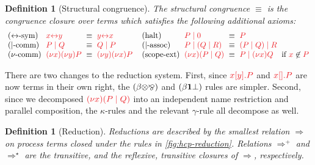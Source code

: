 \documentclass[submission,copyright,creativecommons]{eptcs}
\newtheorem{definition}[lemma]{Definition}
\begin{document}
\begin{definition}[Structural congruence]\label{def:hcp-equiv}
  The structural congruence $\equiv$ is the congruence closure over terms which satisfies the following additional axioms:
  \[
    \setlength{\arraycolsep}{3pt}
    \begin{array}{llcllllcll}
        \cpEquivLinkComm
      & \tm{\cpLink{x}{y}}
      & \equiv
      & \tm{\cpLink{y}{x}}
      &
      &
        \hccpEquivMixHalt1
      & \tm{\piPar{P}{\piHalt}}
      & \equiv
      & \tm{P}
      &
      \\
        \hccpEquivMixComm
      & \tm{\piPar{P}{Q}}
      & \equiv
      & \tm{\piPar{Q}{P}}
      &
      &
        \hccpEquivMixAss1
      & \tm{\piPar{P}{( \piPar{Q}{R} )}}
      & \equiv
      & \tm{\piPar{( \piPar{P}{Q} )}{R}}
      &
      \\
        \hccpEquivNewComm
      & \tm{\piNew{x}{\piNew{y}{P}}}
      & \equiv
      & \tm{\piNew{y}{\piNew{x}{P}}}
      &
      &
        \hccpEquivScopeExt1
      & \tm{\piNew{x}{( \piPar{P}{Q} )}}
      & \equiv
      & \tm{\piPar{P}{\piNew{x}{Q}}}
      & \text{if }\notFreeIn{x}{P}
    \end{array}
  \]
\end{definition}\noindent
There are two changes to the reduction system. First, since $\tm{\piBoundSend{x}{y}{P}}$ and $\tm{\piBoundSend{x}{}{P}}$ are now terms in their own right, the $(\beta{\ensuremath{\otimes}}{\mathbin{\bindnasrepma}})$ and $(\beta{\ensuremath{\mathbf{1}}}{\bot})$ rules are simpler. Second, since we decomposed $\tm{\cpCut{x}{P}{Q}}$ into an independent name restriction and parallel composition, the $\kappa$-rules and the relevant $\gamma$-rule all decompose as well.
\begin{definition}[Reduction]\label{def:hcp-reduction}
  Reductions are described by the smallest relation $\Longrightarrow$ on process terms closed under the rules in \cref{fig:hcp-reduction}. 
  Relations $\Longrightarrow^{+}$ and $\Longrightarrow^\star$ are the transitive, and the reflexive, transitive closures of $\Longrightarrow$, respectively.
\end{definition}
\end{document}
